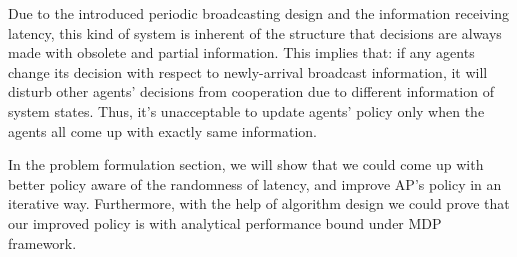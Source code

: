 Due to the introduced periodic broadcasting design and the information receiving latency, this kind of system is inherent of the structure that decisions are always made with obsolete and partial information.
This implies that: if any agents change its decision with respect to newly-arrival broadcast information, it will disturb other agents' decisions from cooperation due to different information of system states.
Thus, it's unacceptable to update agents' policy only when the agents all come up with exactly same information.
        
In the problem formulation section, we will show that we could come up with better policy aware of the randomness of latency, and improve AP's policy in an iterative way.
Furthermore, with the help of algorithm design we could prove that our improved policy is with analytical performance bound under MDP framework.
